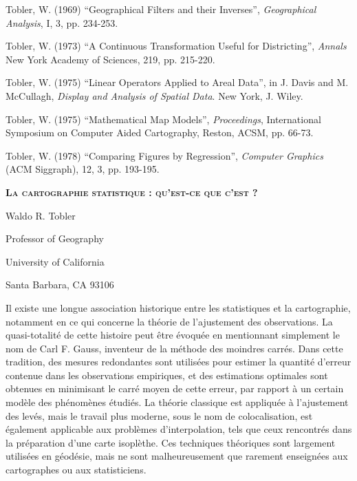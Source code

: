 \documentclass[a4paper,11pt]{article}
\begin{document}
{Tobler, W. (1969) ``Geographical Filters and their Inverses'', \emph{Geographical Analysis}, I, 3, pp. 234-253.

Tobler, W. (1973) ``A Continuous Transformation Useful for Districting'', \emph{Annals} New York Academy of Sciences, 219, pp. 215-220.

Tobler, W. (1975) ``Linear Operators Applied to Areal Data'', in J. Davis and M. McCullagh, \emph{Display and Analysis of Spatial Data}. New York, J. Wiley.

Tobler, W. (1975) ``Mathematical Map Models'', \emph{Proceedings}, International Symposium on Computer Aided Cartography, Reston, ACSM, pp. 66-73.

Tobler, W. (1978) ``Comparing Figures by Regression'', \emph{Computer Graphics} (ACM Siggraph), 12, 3, pp. 193-195.
}

\newpage

\begin{center}

\textbf{\textsc{La cartographie statistique : qu’est-ce que c’est ?}}

\bigskip

Waldo R. Tobler

Professor of Geography

University of California

Santa Barbara, CA 93106

\end{center}

\setcounter{equation}{0}

\smallskip

Il existe une longue association historique entre les statistiques et la cartographie, notamment en ce qui concerne la théorie de l'ajustement des observations. La quasi-totalité de cette histoire peut être évoquée en mentionnant simplement le nom de Carl F. Gauss, inventeur de la méthode des moindres carrés. Dans cette tradition, des mesures redondantes sont utilisées pour estimer la quantité d'erreur contenue dans les observations empiriques, et des estimations \og optimales \fg{} sont obtenues en minimisant le carré moyen de cette erreur, par rapport à un certain modèle des phénomènes étudiés. La théorie classique est appliquée à l'ajustement des levés, mais le travail plus moderne, sous le nom de colocalisation, est également applicable aux problèmes d'interpolation, tels que ceux rencontrés dans la préparation d'une carte isoplèthe. Ces techniques théoriques sont largement utilisées en géodésie, mais ne sont malheureusement que rarement enseignées aux cartographes ou aux statisticiens.
\end{document}
